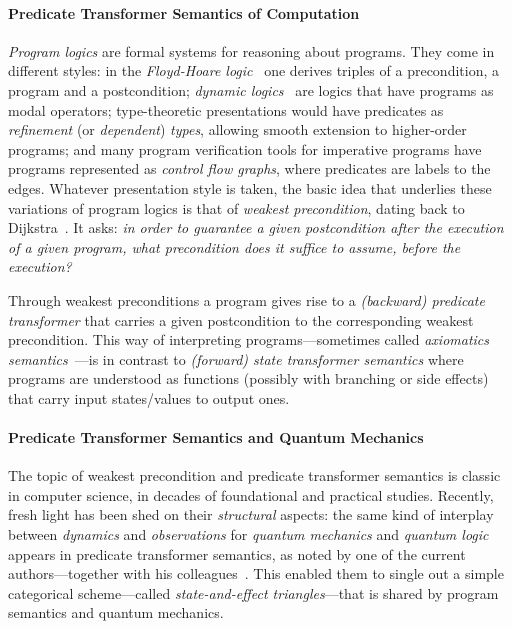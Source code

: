 \documentclass[9pt, preprint]{sigplanconf}
\theoremstyle{theorem}
\theoremstyle{definition}
\begin{document}
\paragraph{Predicate Transformer Semantics of Computation}
\emph{Program logics} are formal systems for reasoning about
programs. They come in different styles:
in the \emph{Floyd-Hoare logic}~\cite{Hoare69} one derives 
 triples
of a
precondition, a program and a postcondition;  \emph{dynamic
logics}~\cite{HarelTK00}
are  logics that have programs as modal operators;
type-theoretic presentations would have predicates as \emph{refinement}
(or \emph{dependent})
\emph{types}, allowing smooth extension to higher-order programs; and many
 program verification tools for imperative programs have
programs represented as \emph{control flow graphs}, where predicates
are labels to the edges. Whatever presentation style is taken, the
basic idea that underlies these variations of program logics is that of
\emph{weakest precondition}, dating back to
Dijkstra~\cite{Dijkstra76}. It asks: \emph{in order to guarantee a given
postcondition after the execution of a given program, what
precondition does it suffice to assume, before the execution?}

Through weakest preconditions a program gives rise to a \emph{(backward)
predicate transformer} that carries a given postcondition to the
corresponding weakest precondition. This way of interpreting
programs---sometimes called \emph{axiomatics
semantics}~\cite{Winskel93}---is in contrast to \emph{(forward) state
transformer semantics} where programs are understood as functions
(possibly with branching or side effects) that carry input states/values
to output ones.

\paragraph{Predicate Transformer Semantics and Quantum Mechanics}
The topic of weakest precondition and predicate transformer semantics
is  classic in computer science, in decades of foundational and
practical studies. Recently, fresh light has been shed on their
\emph{structural} aspects: the same kind of interplay between
\emph{dynamics} and \emph{observations} for \emph{quantum mechanics}
and \emph{quantum logic} appears in predicate transformer semantics,
as noted by one of the current authors---together with his
colleagues~\cite{Jacobs14CMCS,jacobs2015dijkstra,Jacobs15LMCS}.  This
enabled them to single out a simple categorical scheme---called
\emph{state-and-effect triangles}---that is shared by program
semantics and quantum mechanics.
\end{document}
